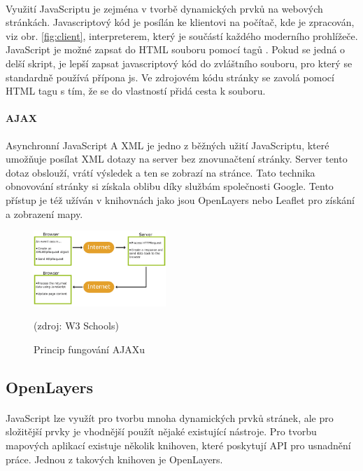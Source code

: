 \documentclass[11pt,a4paper,titlepage,oneside]{book}
\begin{document}

		\paragraph{} Využití JavaScriptu je zejména v tvorbě dynamických prvků na webových stránkách. Javascriptový kód je posílán ke klientovi na počítač, kde je zpracován, viz obr. \ref{fig:client}, interpreterem, který je součástí každého moderního prohlížeče. JavaScript je možné zapsat do \ac{HTML} souboru pomocí tagů . Pokud se jedná o delší skript, je lepší zapsat javascriptový kód do zvláštního souboru, pro který se standardně používá přípona js. Ve zdrojovém kódu stránky se zavolá pomocí \ac{HTML} tagu  s tím, že se do vlastností přidá cesta k souboru.
		\paragraph{AJAX} Asynchronní JavaScript A XML je jedno z běžných užití Java\-Scriptu, které umožňuje posílat \ac{XML} dotazy na server bez znovunačtení stránky. Server tento dotaz obslouží, vrátí výsledek a ten se zobrazí na stránce. Tato technika obnovování stránky si získala oblibu díky službám společnosti Google. Tento přístup je též užíván v knihovnách jako jsou OpenLayers nebo Leaflet pro získání a zobrazení mapy.

		\begin{figure}[!h]
			\begin{center}
				\includegraphics[width=5cm]{obrazky/ajax.png}
				\caption{Princip fungování AJAXu}
				\label{fig:ajax}
				(zdroj: W3 Schools\cite{w3school})
			\end{center}
		\end{figure}	

		\subsection{OpenLayers} %
			\paragraph{} JavaScript lze využít pro tvorbu mnoha dynamických prvků stránek, ale pro složitější prvky je vhodnější použít nějaké existující nástroje. Pro tvorbu mapových aplikací existuje několik knihoven, které poskytují  API  pro usnadnění práce. Jednou z takových knihoven je OpenLayers.
\end{document}
